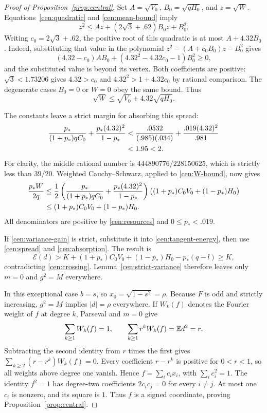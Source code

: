 \begin{proof}[Proof of Proposition~\ref{prop:central}]
Set $A=\sqrt{V_0}$, $B_0=\sqrt{qH_0}$, and $z=\sqrt W$.
Equations~\eqref{cen:quadratic} and \eqref{cen:mean-bound} imply
\[
 z^2\le Az+(2\sqrt3+.62)B_0z+B_0^2.
\]
Writing $c_0=2\sqrt3+.62$, the positive root of this quadratic is at
most $A+4.32B_0$.  Indeed, substituting that value in the polynomial
$z^2-(A+c_0B_0)z-B_0^2$ gives
\[
 (4.32-c_0)AB_0+(4.32^2-4.32c_0-1)B_0^2\ge0,
\]
and the substituted value is beyond its vertex.  Both coefficients
are positive: $\sqrt3<1.73206$ gives
$4.32>c_0$ and $4.32^2>1+4.32c_0$ by rational comparison.
The degenerate cases $B_0=0$ or $W=0$ obey the same bound.  Thus
\begin{equation}\label{cen:W-bound}
 \sqrt W\le\sqrt{V_0}+4.32\sqrt{qH_0}.
\end{equation}

The constants leave a strict margin for absorbing this spread:
\begin{align}
 \frac{p_*}{(1+p_*)qC_0}
 +\frac{p_*(4.32)^2}{1-p_*}
 &<\frac{.0532}{(.985)(.034)}
       +\frac{.019(4.32)^2}{.981}\label{cen:absorption-constant}\\
 &<1.95<2.\notag
\end{align}
For clarity, the middle rational number is
$444890776/228150625$, which is strictly less than $39/20$.
Weighted Cauchy--Schwarz, applied to \eqref{cen:W-bound}, now gives
\begin{align}
 \frac{p_*W}{2q}
 &\le\frac12\left(
       \frac{p_*}{(1+p_*)qC_0}
       +\frac{p_*(4.32)^2}{1-p_*}\right)
       \bigl((1+p_*)C_0V_0+(1-p_*)H_0\bigr)\notag\\
 &\le(1+p_*)C_0V_0+(1-p_*)H_0.
 \label{cen:absorption}
\end{align}
All denominators are positive by \eqref{cen:resources} and
$0\le p_*<.019$.

If \eqref{cen:variance-gain} is strict, substitute it into
\eqref{cen:tangent-energy}, then use \eqref{cen:spread} and
\eqref{cen:absorption}.  The result is
\[
 \mathcal E(d)>K+(1+p_*)C_0V_0+(1-p_*)H_0-p_*(q-l)\ge K,
\]
contradicting \eqref{cen:crossing}.  Lemma~\ref{cen:strict-variance}
therefore leaves only $m=0$ and $g^2=M$ everywhere.

In this exceptional case $b=s$, so $x_0=\sqrt{1-s^2}=\rho$.
Because $F$ is odd and strictly increasing, $g^2=M$ implies
$|d|=\rho$ everywhere.  If $W_k(f)$ denotes the Fourier weight of $f$
at degree $k$, Parseval and $m=0$ give
\[
 \sum_{k\ge1}W_k(f)=1,\qquad
 \sum_{k\ge1}r^kW_k(f)=\mathbb E d^2=r.
\]
Subtracting the second identity from $r$ times the first gives
$\sum_{k\ge2}(r-r^k)W_k(f)=0$.
Every coefficient $r-r^k$ is positive for $0<r<1$, so all weights above
degree one vanish.  Hence $f=\sum_i c_i x_i$, with $\sum_i c_i^2=1$.
The identity $f^2=1$ has degree-two coefficients $2c_ic_j=0$ for every
$i\ne j$.  At most one $c_i$ is nonzero, and its square is $1$.
Thus $f$ is a signed coordinate, proving Proposition~\ref{prop:central}.
\end{proof}

